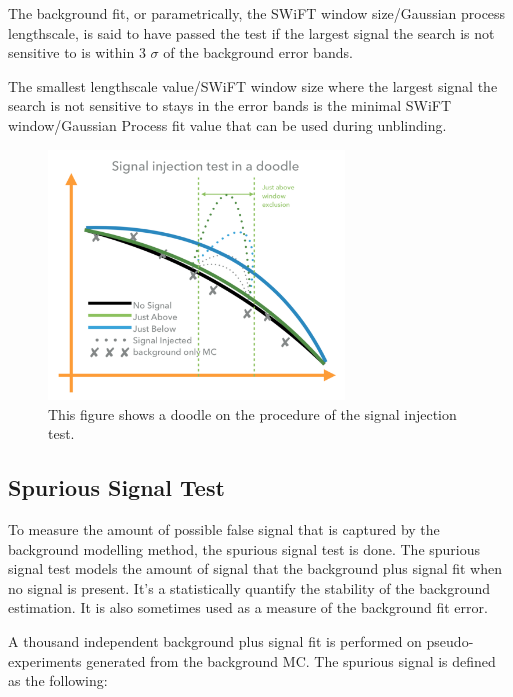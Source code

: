    The background fit, or parametrically, the SWiFT window size/Gaussian process lengthscale, is said to have passed the test if the largest signal the search is not sensitive to is within 3 $\sigma$ of the background error bands. 

   The smallest lengthscale value/SWiFT window size where the largest signal the search is not sensitive to stays in the error bands is the minimal SWiFT window/Gaussian Process fit value that can be used during unblinding. 

\begin{figure}[!htb]
    \begin{center}
        \includegraphics[width=0.7\textwidth]{figures/chapter_analysismethod/SignalInjectionTest}
        \caption{
            This figure shows a doodle on the procedure of the signal injection test.
        }
        \label{signalinjection}
    \end{center}
\end{figure}
\FloatBarrier

    \subsection{Spurious Signal Test} 
    \label{spurious}
    To measure the amount of possible false signal that is captured by the background modelling method, the spurious signal test is done. The spurious signal test models the amount of signal that the background plus signal fit when no signal is present.  It's a statistically quantify the stability of the background estimation. It is also sometimes used as a measure of the background fit error.

    A thousand independent background plus signal fit is performed on pseudo-experiments generated from the background MC. The spurious signal is defined as the following:
    
